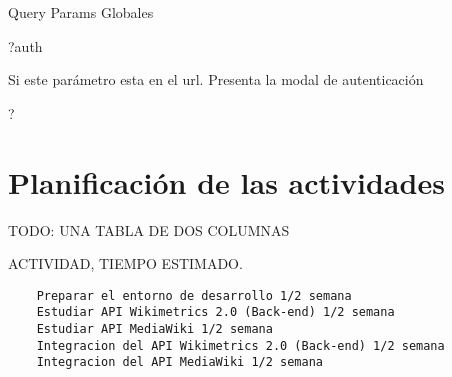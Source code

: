 Query Params Globales

?auth

Si este parámetro esta en el url. Presenta la modal de autenticación 

?

\section{Planificación de las actividades}

TODO: UNA TABLA DE DOS COLUMNAS

ACTIVIDAD, TIEMPO ESTIMADO.

\begin{lstlisting}
    Preparar el entorno de desarrollo 1/2 semana
    Estudiar API Wikimetrics 2.0 (Back-end) 1/2 semana
    Estudiar API MediaWiki 1/2 semana
    Integracion del API Wikimetrics 2.0 (Back-end) 1/2 semana
    Integracion del API MediaWiki 1/2 semana
\end{lstlisting}